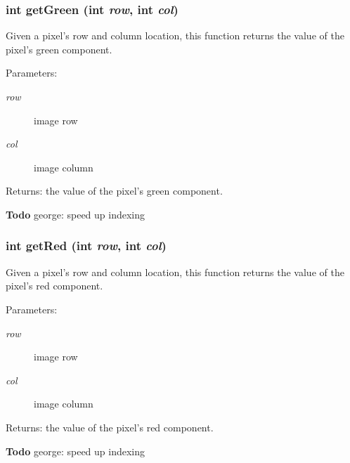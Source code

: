 \subsubsection{\setlength{\rightskip}{0pt plus 5cm}int get\-Green (int {\em row}, int {\em col})}\label{class_c_s_image_viewer_1_1_color_image_data_eb04f53da669ba68d0ddd2dfc0ce9f9e}


Given a pixel's row and column location, this function returns the value of the pixel's green component. 

\begin{Desc}
\item[Parameters:]
\begin{description}
\item[{\em row}]image row \item[{\em col}]image column \end{description}
\end{Desc}
\begin{Desc}
\item[Returns:]the value of the pixel's green component.\end{Desc}
\begin{Desc}
\item[{\bf Todo}]george: speed up indexing \end{Desc}
\subsubsection{\setlength{\rightskip}{0pt plus 5cm}int get\-Red (int {\em row}, int {\em col})}\label{class_c_s_image_viewer_1_1_color_image_data_3c7179eb0903415f89e40451632deca4}


Given a pixel's row and column location, this function returns the value of the pixel's red component. 

\begin{Desc}
\item[Parameters:]
\begin{description}
\item[{\em row}]image row \item[{\em col}]image column \end{description}
\end{Desc}
\begin{Desc}
\item[Returns:]the value of the pixel's red component.\end{Desc}
\begin{Desc}
\item[{\bf Todo}]george: speed up indexing \end{Desc}
